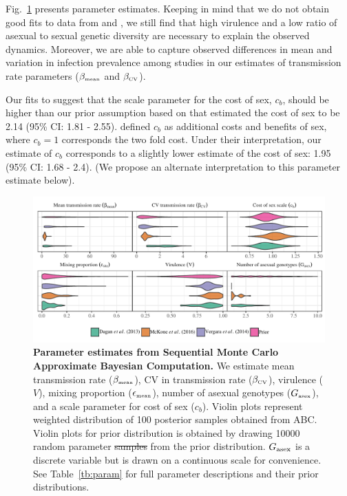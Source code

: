 \documentclass{article}\usepackage[]{graphicx}\usepackage[]{color}
\newcommand{\fref}[1]{Fig.~\ref{fig:#1}}
\providecommand{\DIFaddtex}[1]{{\protect\color{blue}\uwave{#1}}} %
\providecommand{\DIFdeltex}[1]{{\protect\color{red}\sout{#1}}}                      %
\providecommand{\DIFaddFL}[1]{\DIFadd{#1}} %
\providecommand{\DIFdelFL}[1]{\DIFdel{#1}} %
\providecommand{\DIFaddbeginFL}{} %
\providecommand{\DIFaddendFL}{} %
\providecommand{\DIFdelbeginFL}{} %
\providecommand{\DIFdelendFL}{} %
\providecommand{\DIFadd}[1]{\texorpdfstring{\DIFaddtex{#1}}{#1}} %
\providecommand{\DIFdel}[1]{\texorpdfstring{\DIFdeltex{#1}}{}} %
\newcommand{\DIFscaledelfig}{0.5}
\newlength{\DIFdelgraphicswidth} %
\newlength{\DIFdelgraphicsheight} %
\newcommand{\DIFaddincludegraphics}[2][]{{\color{blue}\fbox{\DIFOincludegraphics[#1]{#2}}}} %
\newcommand{\DIFdelincludegraphics}[2][]{%
\sbox{\DIFdelgraphicsbox}{\DIFOincludegraphics[#1]{#2}}%
\settoboxwidth{\DIFdelgraphicswidth}{\DIFdelgraphicsbox} %
\settoboxtotalheight{\DIFdelgraphicsheight}{\DIFdelgraphicsbox} %
\scalebox{\DIFscaledelfig}{%
\parbox[b]{\DIFdelgraphicswidth}{\usebox{\DIFdelgraphicsbox}\\[-\baselineskip] \rule{\DIFdelgraphicswidth}{0em}}\llap{\resizebox{\DIFdelgraphicswidth}{\DIFdelgraphicsheight}{%
\setlength{\unitlength}{\DIFdelgraphicswidth}%
\begin{picture}(1,1)%
\thicklines\linethickness{2pt} %
{\color[rgb]{1,0,0}\put(0,0){\framebox(1,1){}}}%
{\color[rgb]{1,0,0}\put(0,0){\line( 1,1){1}}}%
{\color[rgb]{1,0,0}\put(0,1){\line(1,-1){1}}}%
\end{picture}%
}\hspace*{3pt}}} %
} %
\DeclareRobustCommand{\DIFaddbeginFL}{\DIFOaddbeginFL \let\includegraphics\DIFaddincludegraphics} %
\DeclareRobustCommand{\DIFaddendFL}{\DIFOaddendFL \let\includegraphics\DIFOincludegraphics} %
\DeclareRobustCommand{\DIFdelbeginFL}{\DIFOdelbeginFL \let\includegraphics\DIFdelincludegraphics} %
\DeclareRobustCommand{\DIFdelendFL}{\DIFOaddendFL \let\includegraphics\DIFOincludegraphics} %
\begin{document}
\fref{smcparam} presents parameter estimates.
Keeping in mind that we do not obtain good fits to data from \cite{dagan2013clonal} and \cite{mckone2016fine}, we still find that high virulence and a low ratio of asexual to sexual genetic diversity are necessary to explain the observed dynamics.
Moreover, we are able to capture observed differences in mean and variation in infection prevalence among studies in our estimates of transmission rate parameters ($\beta_{\textrm{\tiny mean}}$ and $\beta_{\textrm{\tiny CV}}$).

Our fits to \cite{mckone2016fine} suggest that the scale parameter for the cost of sex, $c_b$, should be higher than our prior assumption based on \cite{gibson2017two} that estimated the cost of sex to be 2.14 (95\% CI: 1.81 - 2.55).
\cite{ashby2015diversity} defined $c_b$ as additional costs and benefits of sex, where $c_b=1$ corresponds the two fold cost.
Under their interpretation, our estimate of $c_b$ corresponds to a slightly lower estimate of the cost of sex: 1.95 (95\% CI: 1.68 - 2.4). 
(We propose an alternate interpretation to this parameter estimate below).

\begin{figure}[!ht]
\includegraphics[width=\textwidth]{../fig/posterior.pdf}
\caption{{\bf Parameter estimates from Sequential Monte Carlo Approximate Bayesian Computation.}
We estimate mean transmission rate ($\beta_{\textrm{\tiny mean}}$), CV in transmission rate ($\beta_{\textrm{\tiny CV}}$), virulence ($V$), mixing proportion ($\epsilon_{\textrm{\tiny mean}}$), number of asexual genotypes ($G_{\textrm{\tiny asex}}$), and a scale parameter for cost of sex ($c_b$).
Violin plots represent weighted distribution of 100 posterior samples obtained from ABC.
Violin plots for prior distribution is obtained by drawing 10000 random parameter \DIFdelbeginFL \DIFdelFL{samples }\DIFdelendFL \DIFaddbeginFL \DIFaddFL{sets }\DIFaddendFL from the prior distribution.
$G_{\tiny \textrm{asex}}$ is a discrete variable but is drawn on a continuous scale for convenience.
See Table~\ref{tb:param} for full parameter descriptions and their prior distributions.
}
\label{fig:smcparam}
\end{figure}
\end{document}

